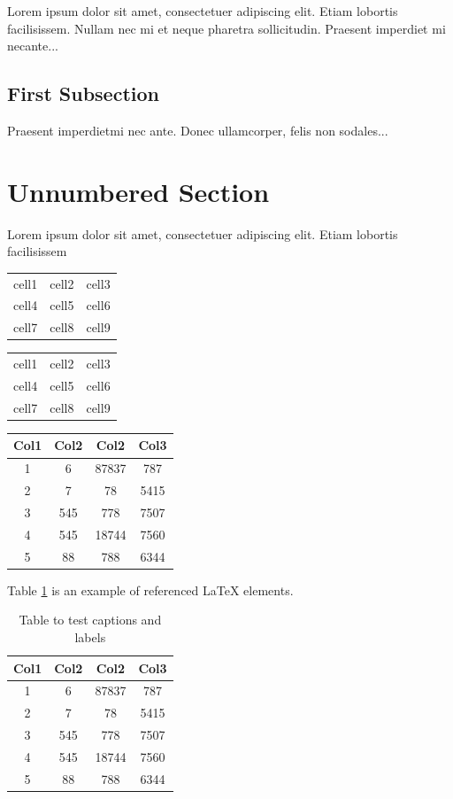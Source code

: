 \documentclass{article}
\begin{document}
	Lorem ipsum dolor sit amet, consectetuer adipiscing elit.  
	Etiam lobortis facilisissem.  Nullam nec mi et neque pharetra 
	sollicitudin.  Praesent imperdiet mi necante...
	
	\subsection{First Subsection}
	Praesent imperdietmi nec ante. Donec ullamcorper, felis non sodales...
	
	\section*{Unnumbered Section}
	Lorem ipsum dolor sit amet, consectetuer adipiscing elit.  
	Etiam lobortis facilisissem
	
	\begin{center}
		\begin{tabular}{ c c c }
			cell1 & cell2 & cell3 \\ 
			cell4 & cell5 & cell6 \\  
			cell7 & cell8 & cell9    
		\end{tabular}
	\end{center}
    \begin{center}
    	\begin{tabular}{ |c|c|c| } 
    		\hline
    		cell1 & cell2 & cell3 \\ 
    		cell4 & cell5 & cell6 \\ 
    		cell7 & cell8 & cell9 \\ 
    		\hline
    	\end{tabular}
    \end{center}
	\begin{center}
		\begin{tabular}{||c c c c||} 
			\hline
			Col1 & Col2 & Col2 & Col3 \\ [0.5ex] 
			\hline\hline
			1 & 6 & 87837 & 787 \\ 
			\hline
			2 & 7 & 78 & 5415 \\
			\hline
			3 & 545 & 778 & 7507 \\
			\hline
			4 & 545 & 18744 & 7560 \\
			\hline
			5 & 88 & 788 & 6344 \\ [1ex] 
			\hline
		\end{tabular}
	\end{center}
	Table \ref{table:data} is an example of referenced \LaTeX{} elements.
	
	\begin{table}[h!]
		\centering
		\begin{tabular}{||c c c c||} 
			\hline
			Col1 & Col2 & Col2 & Col3 \\ [0.5ex] 
			\hline\hline
			1 & 6 & 87837 & 787 \\ 
			2 & 7 & 78 & 5415 \\
			3 & 545 & 778 & 7507 \\
			4 & 545 & 18744 & 7560 \\
			5 & 88 & 788 & 6344 \\ [1ex] 
			\hline
		\end{tabular}
		\caption{Table to test captions and labels}
		\label{table:data}
	\end{table}
\end{document}
